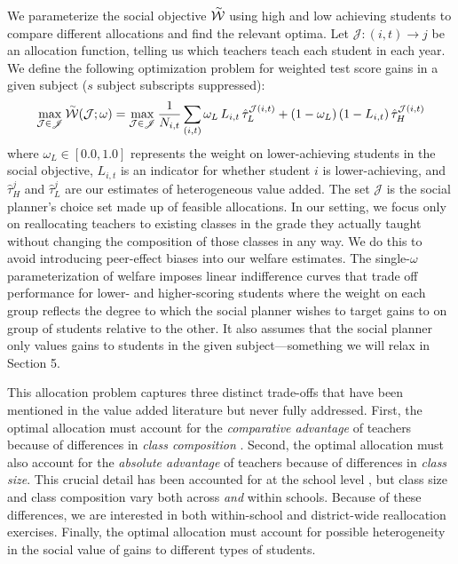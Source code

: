 \documentclass[12pt]{article}
\theoremstyle{definition}
\theoremstyle{definition}
\theoremstyle{definition}
\theoremstyle{definition}
\begin{document}
We parameterize the social objective $\accentset{\sim}{\mathcal{W}}$ using high and low achieving students to compare different allocations and find the relevant optima. Let $\mathcal{J}: (i,t)\to j$ be an allocation function, telling us which teachers teach each student in each year. We define the following optimization problem for weighted test score gains in a given subject ($s$ subject subscripts suppressed):
\begin{equation}\label{opt}
\max_{\mathcal{J}\in\mathscr{J}} \accentset{\sim}{\mathcal{W}}(\mathcal{J};\omega) = \max_{\mathcal{J}\in\mathscr{J}} \frac{1}{N_{i,t}}\sum_{(i,t)} \omega_{L} \,L_{i,t} \,\hat{\tau}^{\mathcal{J}(i,t)}_{L}  +(1-\omega_{L}) \, (1-L_{i,t}) \, \hat{\tau}^{\mathcal{J}(i,t)}_{H}
\end{equation}\noindent where $\omega_{L}\in[0.0,1.0]$ represents the weight on lower-achieving students in the social objective, $L_{i,t}$ is an indicator for whether student $i$ is lower-achieving, and $\hat{\tau}^j_{H}$ and $\hat{\tau}^j_{L}$ are our estimates of heterogeneous value added. The set $\mathscr{J}$ is the social planner's choice set made up of feasible allocations. In our setting, we focus only on reallocating teachers to existing classes in the grade they actually taught without changing the composition of those classes in any way. We do this to avoid introducing peer-effect biases into our welfare estimates.  The single-$\omega$ parameterization of welfare imposes linear indifference curves that trade off performance for lower- and higher-scoring students where the weight on each group reflects the degree to which the social planner wishes to target gains to on group of students relative to the other. It also assumes that the social planner only values gains to students in the given subject---something we will relax in Section 5.



This allocation problem captures three distinct trade-offs that have been mentioned in the value added literature but never fully addressed. First, the optimal allocation must account for the \textit{comparative advantage} of teachers because of differences in \textit{class composition} \citep[as pointed out in][]{Delgado2020}. Second, the optimal allocation must also account for the \textit{absolute advantage} of teachers because of differences in \textit{class size}. This crucial detail has been accounted for at the school level \citep[see][]{bates2022teacher}, but class size and class composition vary both across \textit{and} within schools. Because of these differences, we are interested in both within-school and district-wide reallocation exercises. Finally, the optimal allocation must account for possible heterogeneity in the social value of gains to different types of students. 
\end{document}
